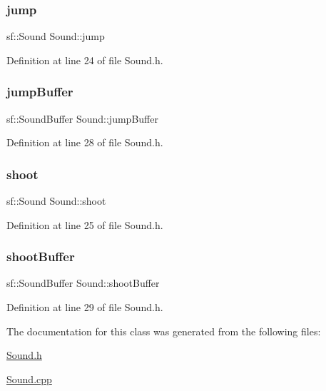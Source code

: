 \subsubsection{\texorpdfstring{jump}{jump}}
{\footnotesize\ttfamily sf\+::\+Sound Sound\+::jump}



Definition at line 24 of file Sound.\+h.

\hypertarget{class_sound_afb04ee141c3765d1cd14fef2268029f3}{}\label{class_sound_afb04ee141c3765d1cd14fef2268029f3} 
\subsubsection{\texorpdfstring{jump\+Buffer}{jumpBuffer}}
{\footnotesize\ttfamily sf\+::\+Sound\+Buffer Sound\+::jump\+Buffer}



Definition at line 28 of file Sound.\+h.

\hypertarget{class_sound_abe6dfe8e86c4fa694b0d5ce693213f2f}{}\label{class_sound_abe6dfe8e86c4fa694b0d5ce693213f2f} 
\subsubsection{\texorpdfstring{shoot}{shoot}}
{\footnotesize\ttfamily sf\+::\+Sound Sound\+::shoot}



Definition at line 25 of file Sound.\+h.

\hypertarget{class_sound_a963c0081728c14318b99dc8618a950c6}{}\label{class_sound_a963c0081728c14318b99dc8618a950c6} 
\subsubsection{\texorpdfstring{shoot\+Buffer}{shootBuffer}}
{\footnotesize\ttfamily sf\+::\+Sound\+Buffer Sound\+::shoot\+Buffer}



Definition at line 29 of file Sound.\+h.



The documentation for this class was generated from the following files\+:\begin{DoxyCompactItemize}
\item 
\hyperlink{_sound_8h}{Sound.\+h}\item 
\hyperlink{_sound_8cpp}{Sound.\+cpp}\end{DoxyCompactItemize}
